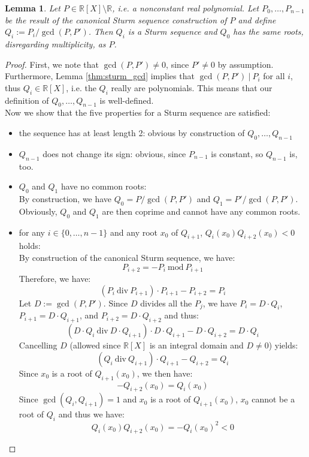 \documentclass[11pt,a4paper,oneside]{article}
\newtheorem{lemma}[definition]{Lemma}
\newcommand{\RR}{\mathbb{R}}
\begin{document}
\begin{lemma}\label{thm:sturm_multiple_aux}
Let $P\in\RR[X]\setminus\RR$, i.e. a nonconstant real polynomial. Let $P_0,\ldots,P_{n-1}$ be the result of the canonical Sturm sequence construction of $P$ and define $Q_i := P_i / \gcd(P,P')$. Then $Q_i$ is a Sturm sequence and $Q_0$ has the same roots, disregarding multiplicity, as $P$.
\end{lemma}
\begin{proof}
First, we note that $\gcd(P,P')\neq 0$, since $P'\neq 0$ by assumption. Furthermore, Lemma \ref{thm:sturm_gcd} implies that $\gcd(P,P')\ |\ P_i$ for all $i$, thus $Q_i\in\RR[X]$, i.e. the $Q_i$ really are polynomials. This means that our definition of $Q_0,\ldots,Q_{n-1}$ is well-defined.\\
Now we show that the five properties for a Sturm sequence are satisfied:
\begin{itemize}
\item the sequence has at least length 2: obvious by construction of $Q_0, \ldots, Q_{n-1}$
\item $Q_{n-1}$ does not change its sign: obvious, since $P_{n-1}$ is constant, so $Q_{n-1}$ is, too.
\item $Q_0$ and $Q_1$ have no common roots:\\
By construction, we have $Q_0 = P / \gcd(P,P')$ and $Q_1 = P' / \gcd(P, P')$. Obviously, $Q_0$ and $Q_1$ are then coprime and cannot have any common roots.
\item for any $i\in\{0,\ldots,n-1\}$ and any root $x_0$ of $Q_{i+1}$, $Q_{i}(x_0)Q_{i+2}(x_0) < 0$ holds:\\
By construction of the canonical Sturm sequence, we have:
$$P_{i+2} = -P_{i}\ \mathrm{mod}\ P_{i+1}$$
Therefore, we have:
$$(P_{i}\ \mathrm{div}\ P_{i+1}) \cdot P_{i+1} - P_{i+2} = P_{i}$$
Let $D:=\gcd(P,P')$. Since $D$ divides all the $P_j$, we have $P_{i}=D\cdot Q_{i}$, $P_{i+1}=D\cdot Q_{i+1}$, and $P_{i+2}=D\cdot Q_{i+2}$ and thus:
$$(D\cdot Q_{i}\ \mathrm{div}\ D\cdot Q_{i+1}) \cdot D\cdot Q_{i+1} - D\cdot Q_{i+2} = D\cdot Q_{i}$$
Cancelling $D$ (allowed since $\RR[X]$ is an integral domain and $D\neq 0$) yields:
$$(Q_{i}\ \mathrm{div}\ Q_{i+1}) \cdot Q_{i+1} - Q_{i+2} = Q_{i}$$
Since $x_0$ is a root of $Q_{i+1}(x_0)$, we then have:
$$-Q_{i+2}(x_0) = Q_{i}(x_0)$$
Since $\gcd(Q_{i}, Q_{i+1}) = 1$ and $x_0$ is a root of $Q_{i+1}(x_0)$, $x_0$ cannot be a root of $Q_{i}$ and thus we have:
$$Q_{i}(x_0)Q_{i+2}(x_0) = -Q_{i}(x_0)^2 < 0$$


\end{itemize}
\end{proof}
\end{document}
